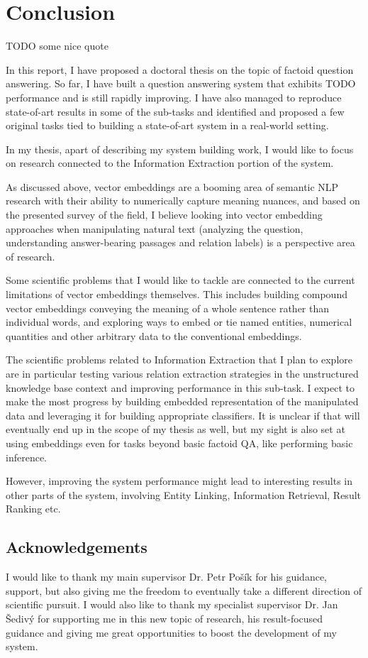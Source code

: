 \chapter{Conclusion}
\label{ch:concl}

TODO some nice quote

In this report, I have proposed a doctoral thesis on the topic
of factoid question answering.
So far, I have built a question answering system that exhibits
TODO performance and is still rapidly improving.  I have also
managed to reproduce state-of-art results in some of the sub-tasks
and identified and proposed a few original tasks tied to building
a state-of-art system in a real-world setting.

In my thesis, apart of describing my system building work, I would
like to focus on research connected to the Information Extraction
portion of the system.

As discussed above, vector embeddings are a booming area of semantic
NLP research with their ability to numerically capture meaning nuances,
and based on the presented survey of the field, I believe looking into
vector embedding approaches when manipulating natural text
(analyzing the question, understanding answer-bearing
passages and relation labels) is a perspective area of research.

Some scientific problems that I would like to tackle are connected
to the current limitations of vector embeddings themselves.
This includes building compound vector embeddings conveying
the meaning of a whole sentence rather than individual words,
and
exploring ways to embed or tie named entities, numerical quantities
and other arbitrary data to the conventional embeddings.

The scientific problems related to Information Extraction that
I plan to explore are in particular testing various relation
extraction strategies in the unstructured knowledge base context
and improving performance in this sub-task.
I expect to make the most progress by building embedded
representation of the manipulated data and leveraging it for
building appropriate classifiers.
It is unclear if that will eventually end up in the scope of my
thesis as well, but my sight is also set at using embeddings even
for tasks beyond basic factoid QA, like performing basic inference.

However, improving the system performance might lead to interesting
results in other parts of the system, involving Entity Linking,
Information Retrieval, Result Ranking etc.

\section{Acknowledgements}

I would like to thank my main supervisor Dr. Petr Pošík
for his guidance, support, but also giving me the freedom to
eventually take a different direction of scientific pursuit.
I would also like to thank my specialist supervisor Dr. Jan Šedivý
for supporting me in this new topic of research, his result-focused
guidance and giving me great opportunities to boost the development
of my system.
